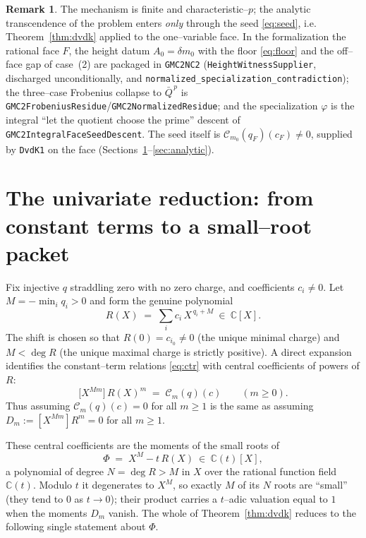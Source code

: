 \documentclass[11pt,reqno]{amsart}
\theoremstyle{plain}
\theoremstyle{definition}
\newtheorem{remark}[theorem]{Remark}
\newcommand{\C}{\mathbb{C}}
\begin{document}
\begin{remark}
The mechanism is finite and characteristic--$p$; the analytic transcendence of the problem enters
\emph{only} through the seed \eqref{eq:seed}, i.e. Theorem~\ref{thm:dvdk} applied to the one--variable
face. In the formalization the rational face $F$, the height datum $A_0=\delta m_0$ with the floor
\eqref{eq:floor} and the off--face gap of case~(2) are packaged in \texttt{GMC2NC2}
(\texttt{HeightWitnessSupplier}, discharged unconditionally, and
\texttt{normalized\_specialization\_contradiction}); the three--case Frobenius collapse to $\bar Q^{\,p}$
is \texttt{GMC2FrobeniusResidue}/\texttt{GMC2NormalizedResidue}; and the specialization $\varphi$ is the
integral ``let the quotient choose the prime'' descent of \texttt{GMC2IntegralFaceSeedDescent}. The seed
itself is $\mathcal C_{m_0}(q_F)(c_F)\ne0$, supplied by \texttt{DvdK1} on the face
(Sections~\ref{sec:univariate}--\ref{sec:analytic}).
\end{remark}

\section{The univariate reduction: from constant terms to a small--root packet}\label{sec:univariate}

Fix injective $q$ straddling zero with no zero charge, and coefficients $c_i\ne0$. Let
$M=-\min_i q_i>0$ and form the genuine polynomial
\[
  R(X)\;=\;\sum_i c_i\,X^{\,q_i+M}\ \in\ \C[X].
\]
The shift is chosen so that $R(0)=c_{i_0}\ne0$ (the unique minimal charge) and
$M<\deg R$ (the unique maximal charge is strictly positive). A direct expansion identifies the
constant--term relations \eqref{eq:ctr} with central coefficients of powers of $R$:
\begin{equation}\label{eq:checkA}
  \big[X^{Mm}\big]\,R(X)^m \;=\; \mathcal C_m(q)(c)\qquad (m\ge0).
\end{equation}
Thus assuming $\mathcal C_m(q)(c)=0$ for all $m\ge1$ is the same as assuming
$D_m:=[X^{Mm}]R^m=0$ for all $m\ge1$.

These central coefficients are the moments of the small roots of
\begin{equation}\label{eq:Phi}
  \Phi\;=\;X^{M}-t\,R(X)\ \in\ \C(t)[X],
\end{equation}
a polynomial of degree $N=\deg R>M$ in $X$ over the rational function field $\C(t)$. Modulo $t$ it
degenerates to $X^{M}$, so exactly $M$ of its $N$ roots are ``small'' (they tend to $0$ as $t\to0$);
their product carries a $t$--adic valuation equal to $1$ when the moments $D_m$ vanish. The whole of
Theorem~\ref{thm:dvdk} reduces to the following single statement about $\Phi$.
\end{document}
